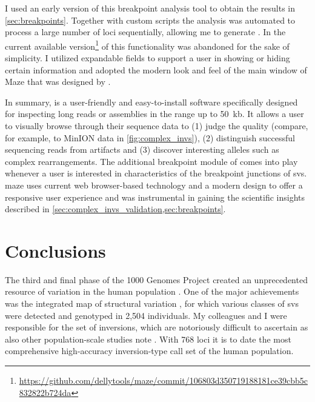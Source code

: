 I used an early version of this breakpoint analysis tool to obtain the results
in \cref{sec:breakpoints}. Together with custom scripts the analysis was
automated to process a large number of loci sequentially, allowing me to
generate .
In the current available version\footnote{\url{https://github.com/dellytools/maze/commit/106803d350719188181ce39cbb5c832822b724da}}
of \maze this functionality was abandoned for the sake of simplicity. I utilized
expandable fields to support a user in showing or hiding certain information and
adopted the modern look and feel of the main window of Maze that was designed by
\markus.

In summary, \maze is a user-friendly and easy-to-install software specifically
designed for inspecting long reads or assemblies in the range up to 50~kb. It
allows a user to visually browse through their sequence data to (1) judge the
quality (compare, for example, \pacbio to \ont MinION data in \cref{fig:complex_invs}),
(2) distinguish successful sequencing reads from artifacts and (3) discover
interesting alleles such as complex rearrangements. The additional breakpoint
module of \maze comes into play whenever a user is interested in characteristics
of the breakpoint junctions of \acp{sv}. \Ac{maze} uses current web browser-based
technology and a modern design to offer a responsive user experience and was
instrumental in gaining the scientific insights described in
\cref{sec:complex_invs_validation,sec:breakpoints}.








\section{Conclusions}

The third and final phase of the 1000 Genomes Project created an unprecedented
resource of variation in the human population \citep{Auton2015}. One of the
major achievements was the integrated map of structural variation
\citep{Sudmant2015}, for which various classes of \acp{sv} were detected and
genotyped in 2,504 individuals. My colleagues and I were responsible for the
set of inversions, which are notoriously difficult to ascertain as also other
population-scale studies note \citep{Kidd2008,Hehir-Kwa2016}. With 768 loci it
is to date the most comprehensive high-accuracy inversion-type call set of the
human population.

